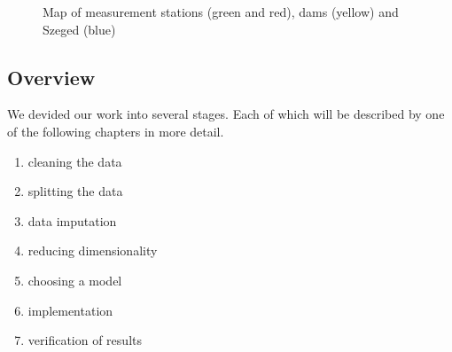 \documentclass{article}
\newenvironment{enumeratenumeric}{\begin{enumerate}[1.] }{\end{enumerate}}
\begin{document}
\begin{figure}[h]
  \caption{Map of measurement stations (green and red), dams (yellow) and
  Szeged (blue)\label{map}}
\end{figure}

\subsection{Overview}

We devided our work into several stages. Each of which will be described by
one of the following chapters in more detail.
\begin{enumeratenumeric}
  \item cleaning the data
  
  \item splitting the data
  
  \item data imputation
  
  \item reducing dimensionality
  
  \item choosing a model
  
  \item implementation
  
  \item verification of results
\end{enumeratenumeric}
\end{document}
